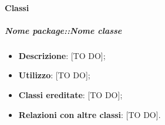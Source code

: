 		\paragraph{Classi} %
			\subparagraph{Nome package::Nome classe} %
			\label{subp:subparagraph_name}
				\begin{itemize}
					\item \textbf{Descrizione}: [TO DO];
					\item \textbf{Utilizzo}: [TO DO];
					\item \textbf{Classi ereditate}: [TO DO];
					\item \textbf{Relazioni con altre classi}: [TO DO].
				\end{itemize}



